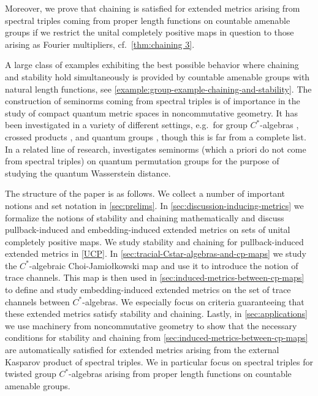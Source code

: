 \documentclass[11pt, a4paper, oneside, final, reqno]{amsart}
\theoremstyle{definition}
\theoremstyle{plain}
\theoremstyle{remark}
\numberwithin{equation}{section}
\begin{document}
Moreover, we prove that chaining is satisfied for extended metrics arising from spectral triples coming from proper length functions on countable amenable groups if we restrict the unital completely positive maps in question to those arising as Fourier multipliers, cf.~\cref{thm:chaining 3}.

A large class of examples exhibiting the best possible behavior where chaining and stability hold simultaneously is provided by countable amenable groups with natural length functions, see \cref{example:group-example-chaining-and-stability}. The construction of seminorms coming from spectral triples is of importance in the study of compact quantum metric spaces in noncommutative geometry. It has been investigated in a variety of different settings, e.g.~for group $C^*$-algebras \cite{OzawaRieffel, ChristRieffel}, crossed products \cite{HawkinsSkalskiWhiteZacharias, Klisse2024, AustadKaadKyed}, and quantum groups \cite{BhowmickVoigtZacharias, AguilarKaad2018, KaadKyed2025, AustadKyed2025}, though this is far from a complete list. In a related line of research, \cite{AnshuJekelLandry25} investigates seminorms (which a priori do not come from spectral triples) on quantum permutation groups for the purpose of studying the quantum Wasserstein distance.

The structure of the paper is as follows. We collect a number of important notions and set  notation in \cref{sec:prelims}. In \cref{sec:discussion-inducing-metrics} we formalize the notions of stability and chaining mathematically and discuss pullback-induced and embedding-induced extended metrics on sets of unital completely positive maps. We study stability and chaining for pullback-induced extended metrics in \cref{UCP}. In \cref{sec:tracial-Cstar-algebras-and-cp-maps} we study the $C^*$-algebraic Choi-Jamio\l{}kowski map and use it to introduce the notion of trace channels. This map is then used in \cref{sec:induced-metrics-between-cp-maps} to define and study embedding-induced extended metrics on the set of trace channels between $C^*$-algebras. We especially focus on criteria guaranteeing that these extended metrics satisfy stability and chaining. Lastly, in  \cref{sec:applications} we use machinery from noncommutative geometry to show that the necessary conditions for stability and chaining from \cref{sec:induced-metrics-between-cp-maps} are automatically satisfied for extended metrics arising from the external Kasparov product of spectral triples. We in particular focus on spectral triples for twisted group $C^*$-algebras arising from proper length functions on countable amenable groups.
\end{document}
